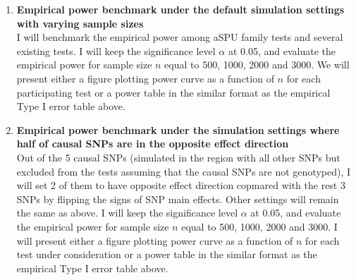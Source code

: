 \documentclass[12pt]{article}
\begin{document}
\begin{enumerate}
\item \textbf{Empirical power benchmark under the default simulation settings with varying sample sizes}\\
I will benchmark the empirical power among aSPU family tests and several existing tests. I will keep the significance level $\alpha$ at 0.05, and evaluate the empirical power for sample size $n$ equal to 500, 1000, 2000 and 3000. We will present either a figure plotting power curve as a function of $n$ for each participating test or a power table in the similar format as the empirical Type I error table above.
%

\item \textbf{Empirical power benchmark under the simulation settings where half of causal SNPs are in the opposite effect direction}\\
Out of the 5 causal SNPs (simulated in the region with all other SNPs but excluded from the tests assuming that the causal SNPs are not genotyped), I will set 2 of them to have opposite effect direction copmared with the rest 3 SNPs by flipping the signs of SNP main effects. Other settings will remain the same as above. I will  keep the significance level $\alpha$ at 0.05, and evaluate the empirical power for sample size $n$ equal to 500, 1000, 2000 and 3000. I will present either a figure plotting power curve as a function of $n$ for each test under consideration or a power table in the similar format as the empirical Type I error table above.


\end{enumerate}
\end{document}
